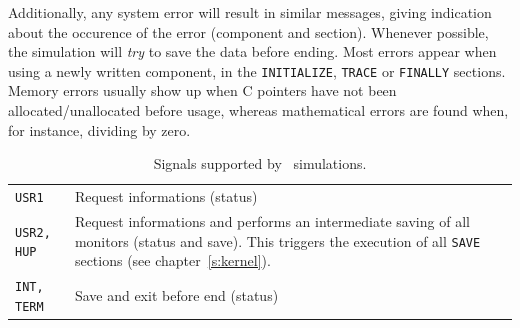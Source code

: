 Additionally, any system error will result in similar messages, giving
indication about the occurence of the error (component and
section). Whenever possible, the simulation will {\em try} to save the
data before ending. Most errors appear when using a newly written component, in the \texttt{INITIALIZE}, \texttt{TRACE} or \texttt{FINALLY} sections. Memory errors usually show up when C pointers have not been allocated/unallocated before usage, whereas mathematical errors are found when, for instance, dividing by zero.

\begin{table}
  \begin{center}
    {\let\my=\\
    \begin{tabular}{|p{}|p{}|}
      \hline
      \texttt{USR1} & Request informations (status)  \\
      \texttt{USR2, HUP} & Request informations and performs an intermediate saving of all monitors (status and save). This triggers the execution of all \texttt{SAVE} sections (see chapter~\ref{s:kernel}).  \\
      \texttt{INT, TERM} & Save and exit before end (status)  \\
      \hline
    \end{tabular}
    \caption{Signals supported by \MCS\ simulations.}
    \label{t:signals}
    }
  \end{center}
\end{table}

